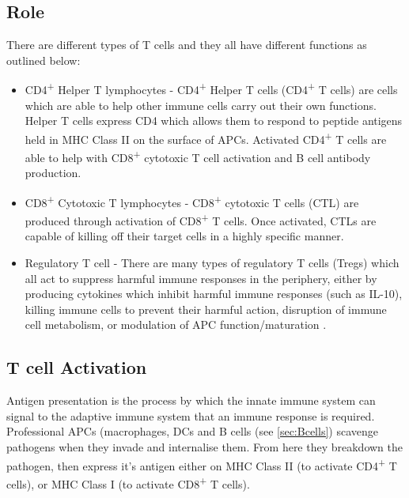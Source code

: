 \subsection{Role}
\label{subsec:Tcellfunctions}

There are different types of T cells and they all have different functions as outlined below:


\begin{itemize}
\item CD4\textsuperscript{+} Helper T lymphocytes - CD4\textsuperscript{+} Helper T cells (CD4\textsuperscript{+} T cells) are cells which are able to help other immune cells carry out their own functions. 
Helper T cells express CD4 which allows them to respond to peptide antigens held in MHC Class II on the surface of APCs. 
Activated CD4\textsuperscript{+} T cells are able to help with CD8\textsuperscript{+} cytotoxic T cell activation and B cell antibody production.
\item CD8\textsuperscript{+} Cytotoxic T lymphocytes - CD8\textsuperscript{+} cytotoxic T cells (CTL) are produced through activation of CD8\textsuperscript{+} T cells.
Once activated, CTLs are capable of killing off their target cells in a highly specific manner.
\item Regulatory T cell - There are many types of regulatory T cells (Tregs) which all act to suppress harmful immune responses in the periphery, either by producing cytokines which inhibit harmful immune responses (such as IL-10), killing immune cells to prevent their harmful action, disruption of immune cell metabolism, or modulation of APC function/maturation \citep{Vignali2008}. 
\end{itemize}

\subsection{T cell Activation}
\label{subsec:Tcellactivation}


Antigen presentation is the process by which the innate immune system can signal to the adaptive immune system that an immune response is required.
Professional APCs (macrophages, DCs and B cells (see \cref{sec:Bcells}) scavenge pathogens when they invade and internalise them.
From here they breakdown the pathogen, then express it's antigen either on MHC Class II (to activate CD4\textsuperscript{+} T cells), or MHC Class I (to activate CD8\textsuperscript{+} T cells).

